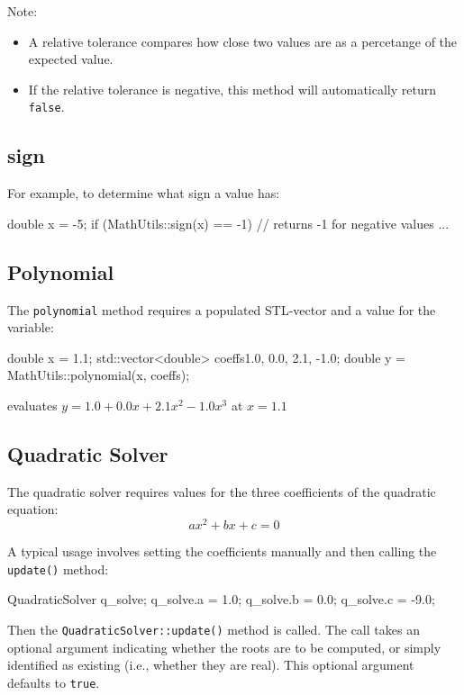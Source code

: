 \documentclass[11pt,fleqn]{report}
\begin{document}
Note:
\begin{itemize}
\item A relative tolerance compares how close two values are as a 
percetange of the expected value.
\item If the relative tolerance is negative, this method will
automatically return \texttt{false}.
\end{itemize}

\subsection{sign}
For example, to determine what sign a value has:
\begin{code}
double x = -5;
if (MathUtils::sign(x) == -1) { // returns -1 for negative values
...
}
\end{code}

\subsection{Polynomial}
The \texttt{polynomial} method requires a populated STL-vector and a value
for the variable:
\begin{code}
double x = 1.1;
std::vector<double> coeffs{1.0, 0.0, 2.1, -1.0};
double y = MathUtils::polynomial(x, coeffs);
\end{code}
evaluates $y = 1.0 + 0.0x + 2.1 x^2 -1.0 x^3$ at $x=1.1$


\subsection{Quadratic Solver}

The quadratic solver requires values for the three coefficients of the quadratic equation:
\begin{equation*}
ax^2 + bx + c = 0
\end{equation*}

A typical usage involves setting the coefficients manually and then calling the 
\texttt{update()} method:
\begin{code}
QuadraticSolver q_solve;
q_solve.a = 1.0;
q_solve.b = 0.0;
q_solve.c = -9.0;
\end{code}

Then the \texttt{QuadraticSolver::update()} method is called. The call takes
an optional argument indicating whether the roots are to be computed, or
simply identified as existing (i.e., whether they are real). This optional argument
defaults to \texttt{true}.
\end{document}
